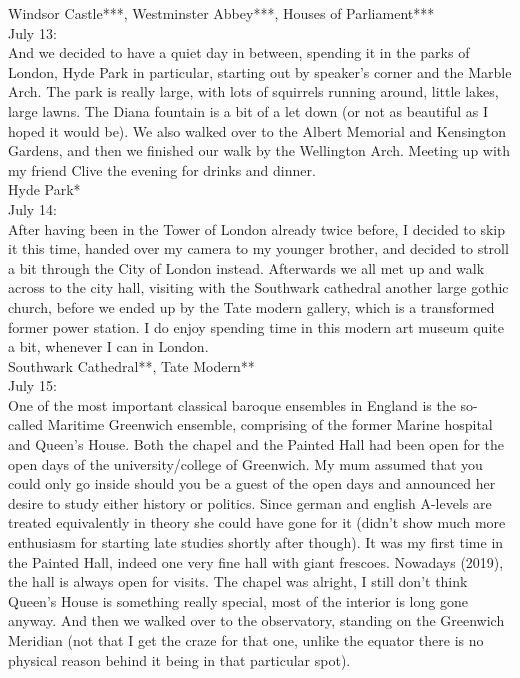Windsor Castle***, Westminster Abbey***, Houses of Parliament***\\

July 13:\\
And we decided to have a quiet day in between, spending it in the parks of London, Hyde Park in particular, starting out by speaker's corner and the Marble Arch. The park is really large, with lots of squirrels running around, little lakes, large lawns. The Diana fountain is a bit of a let down (or not as beautiful as I hoped it would be). We also walked over to the Albert Memorial and Kensington Gardens, and then we finished our walk by the Wellington Arch. Meeting up with my friend Clive the evening for drinks and dinner.\\

Hyde Park*\\

July 14:\\
After having been in the Tower of London already twice before, I decided to skip it this time, handed over my camera to my younger brother, and decided to stroll a bit through the City of London instead. Afterwards we all met up and walk across to the city hall, visiting with the Southwark cathedral another large gothic church, before we ended up by the Tate modern gallery, which is a transformed former power station. I do enjoy spending time in this modern art museum quite a bit, whenever I can in London.\\

Southwark Cathedral**,  Tate Modern**\\

July 15:\\
One of the most important classical baroque ensembles in England is the so-called Maritime Greenwich ensemble, comprising of the former Marine hospital and Queen's House. Both the chapel and the Painted Hall had been open for the open days of the university/college of Greenwich. My mum assumed that you could only go inside should you be a guest of the open days and announced her desire to study either history or politics. Since german and english A-levels are treated equivalently in theory she could have gone for it (didn't show much more enthusiasm for starting late studies shortly after though). It was my first time in the Painted Hall, indeed one very fine hall with giant frescoes. Nowadays (2019), the hall is always open for visits. The chapel was alright, I still don't think Queen's House is something really special, most of the interior is long gone anyway. And then we walked over to the observatory, standing on the Greenwich Meridian (not that I get the craze for that one, unlike the equator there is no physical reason behind it being in that particular spot).\\

